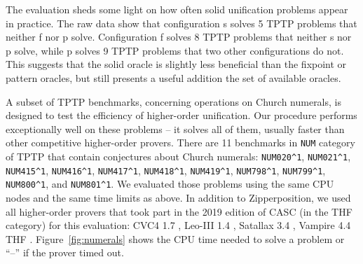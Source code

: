 The evaluation sheds some light on how often solid unification problems appear in practice. 
The raw data show that
configuration s solves 5 TPTP problems that neither f nor p solve. Configuration
f solves 8 TPTP problems that neither s nor p solve, while p solves 9 TPTP
problems that two other configurations do not. This suggests that the solid oracle
is slightly less beneficial than the fixpoint or pattern oracles, but still presents a
useful addition the set of available oracles.

A subset of TPTP benchmarks, concerning operations on Church numerals, is designed to test the efficiency of
higher-order unification. Our procedure performs exceptionally well
on these problems -- it solves all of them, usually
faster than other competitive higher-order provers.
  There are 11 benchmarks in \texttt{NUM} category of TPTP that contain conjectures about
  Church numerals: \texttt{NUM020\^{}1}, \texttt{NUM021\^{}1}, \texttt{NUM415\^{}1},
  \texttt{NUM416\^{}1}, \texttt{NUM417\^{}1}, \texttt{NUM418\^{}1}, \texttt{NUM419\^{}1}, \texttt{NUM798\^{}1},
  \texttt{NUM799\^{}1}, \texttt{NUM800\^{}1}, and \texttt{NUM801\^{}1}.
  We evaluated those problems using the same CPU nodes and the same time limits 
  as above. In addition to Zipperposition, we used
  all higher-order provers that took part in the 2019 edition of CASC \cite{gs-19-casc27} (in the THF category) for this evaluation: CVC4
  1.7 \cite{cbetal-11-cvc4}, Leo-III 1.4 \cite{sb-21-leo3}, Satallax 3.4
  \cite{cb-12-satallax}, Vampire 4.4 THF \cite{lkav-13-vampire}. Figure~\ref{fig:numerals}
  shows the CPU time needed to solve a problem or ``--'' if the prover timed out.

